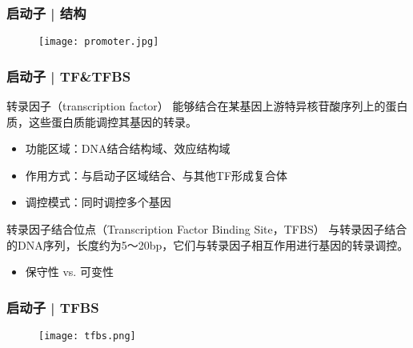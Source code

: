 \begin{frame}
  \frametitle{启动子 | 结构}
  \begin{figure}
    \centering
    \texttt{[image: promoter.jpg]}
  \end{figure}
\end{frame}

\begin{frame}
  \frametitle{启动子 | TF\&TFBS}
  \begin{block}{转录因子（transcription factor）}
    能够结合在某基因上游特异核苷酸序列上的蛋白质，这些蛋白质能调控其基因的转录。
    \begin{itemize}
      \item 功能区域：DNA结合结构域、效应结构域
      \item 作用方式：与启动子区域结合、与其他TF形成复合体
      \item 调控模式：同时调控多个基因
    \end{itemize}
  \end{block}
  \pause
  \begin{block}{转录因子结合位点（Transcription Factor Binding Site，TFBS）}
    与转录因子结合的DNA序列，长度约为5～20bp，它们与转录因子相互作用进行基因的转录调控。
    \begin{itemize}
      \item 保守性 vs. 可变性
    \end{itemize}
  \end{block}
\end{frame}

\begin{frame}
  \frametitle{启动子 | TFBS}
  \begin{figure}
    \centering
    \texttt{[image: tfbs.png]}
  \end{figure}
\end{frame}

